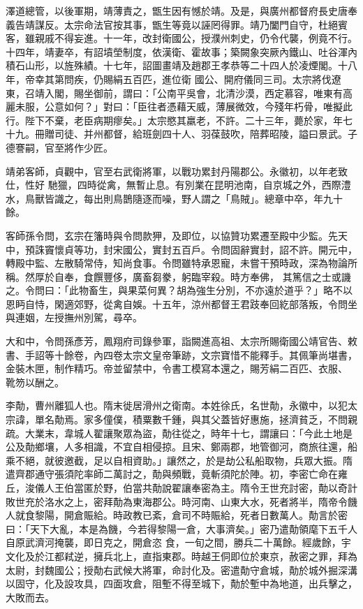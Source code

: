 \begin{pinyinscope}
 澤道總管，以後軍期，靖薄責之，甑生因有憾於靖。及是，與廣州都督府長史唐奉義告靖謀反。太宗命法官按其事，甑生等竟以誣罔得罪。靖乃闔門自守，杜絕賓客，雖親戚不得妄進。十一年，改封衛國公，授濮州刺史，仍令代襲，例竟不行。十四年，靖妻卒，有詔墳塋制度，依漢衛、霍故事；築闕象突厥內鐵山、吐谷渾內積石山形，以旌殊績。十七年，詔圖畫靖及趙郡王孝恭等二十四人於凌煙閣。十八年，帝幸其第問疾，仍賜絹五百匹，進位衛
 國公、開府儀同三司。太宗將伐遼東，召靖入閣，賜坐御前，謂曰：「公南平吳會，北清沙漠，西定慕容，唯東有高麗未服，公意如何？」對曰：「臣往者憑藉天威，薄展微效，今殘年朽骨，唯擬此行。陛下不棄，老臣病期瘳矣。」太宗愍其羸老，不許。二十三年，薨於家，年七十九。冊贈司徒、并州都督，給班劍四十人、羽葆鼓吹，陪葬昭陵，謚曰景武。子德謇嗣，官至將作少匠。



 靖弟客師，貞觀中，官至右武衛將軍，以戰功累封丹陽郡公。永徽初，以年老致仕，性好
 馳獵，四時從禽，無暫止息。有別業在昆明池南，自京城之外，西際澧水，鳥獸皆識之，每出則鳥鵲隨逐而噪，野人謂之「鳥賊」。總章中卒，年九十餘。



 客師孫令問，玄宗在籓時與令問款狎，及即位，以協贊功累遷至殿中少監。先天中，預誅竇懷貞等功，封宋國公，實封五百戶。令問固辭實封，詔不許。開元中，轉殿中監、左散騎常侍，知尚食事。令問雖特承恩寵，未嘗干預時政，深為物論所稱。然厚於自奉，食饌豐侈，廣畜芻豢，躬臨宰殺。時方奉佛，
 其篤信之士或譏之。令問曰：「此物畜生，與果菜何異？胡為強生分別，不亦遠於道乎？」略不以恩眄自恃，閑適郊野，從禽自娛。十五年，涼州都督王君跂奉回紇部落叛，令問坐與連姻，左授撫州別駕，尋卒。



 大和中，令問孫彥芳，鳳翔府司錄參軍，詣闕進高祖、太宗所賜衛國公靖官告、敕書、手詔等十餘卷，內四卷太宗文皇帝筆跡，文宗寶惜不能釋手。其佩筆尚堪書，金裝木匣，制作精巧。帝並留禁中，令書工模寫本還之，賜芳絹二百匹、衣服、
 靴笏以酬之。



 李勣，曹州離狐人也。隋末徙居滑州之衛南。本姓徐氏，名世勣，永徽中，以犯太宗諱，單名勣焉。家多僮僕，積粟數千鍾，與其父蓋皆好惠施，拯濟貧乏，不問親疏。大業末，韋城人翟讓聚眾為盜，勣往從之，時年十七，謂讓曰：「今此土地是公及勣鄉壤，人多相識，不宜自相侵掠。且宋、鄭兩郡，地管御河，商旅往還，船乘不絕，就彼邀截，足以自相資助。」讓然之，於是劫公私船取物，兵眾大振。隋
 遣齊郡通守張須陀率師二萬討之，勣與頻戰，竟斬須陀於陣。初，李密亡命在雍丘，浚儀人王伯當匿於野，伯當共勣說翟讓奉密為主。隋令王世充討密，勣以奇計敗世充於洛水之上，密拜勣為東海郡公。時河南、山東大水，死者將半，隋帝令饑人就食黎陽，開倉賑給。時政教已紊，倉司不時賑給，死者日數萬人。勣言於密曰：「天下大亂，本是為饑，今若得黎陽一倉，大事濟矣。」密乃遣勣領麾下五千人自原武濟河掩襲，即日克之，開倉恣
 食，一旬之間，勝兵二十萬餘。經歲餘，宇文化及於江都弒逆，擁兵北上，直指東郡。時越王侗即位於東京，赦密之罪，拜為太尉，封魏國公；授勣右武候大將軍，命討化及。密遣勣守倉城，勣於城外掘深溝以固守，化及設攻具，四面攻倉，阻塹不得至城下，勣於塹中為地道，出兵擊之，大敗而去。




\end{pinyinscope}
